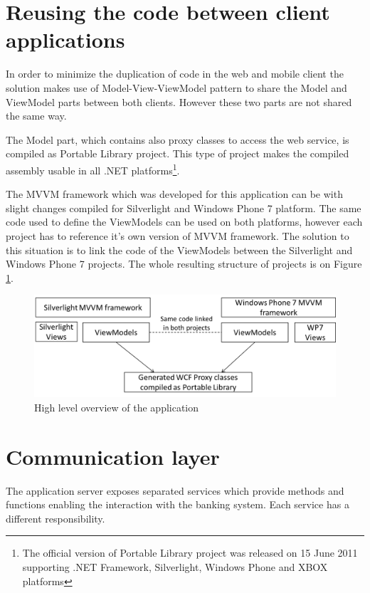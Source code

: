 \section {Reusing the code between client applications}
In order to minimize the duplication of code in the web and mobile client the solution makes use of Model-View-ViewModel pattern to share the Model and ViewModel parts between both clients. However these two parts are not shared the same way.

The Model part, which contains also proxy classes to access the web service, is compiled as Portable Library project. This type of project makes the compiled assembly usable in all .NET platforms\footnote{The official version of Portable Library project was released on 15 June 2011 supporting .NET Framework, Silverlight, Windows Phone and XBOX platforms}.

The MVVM framework which was developed for this application can be with slight changes compiled for Silverlight and Windows Phone 7 platform. The same code used to define the ViewModels can be used on both platforms, however each project has to reference it's own version of MVVM framework. The solution to this situation is to link the code of the ViewModels between the Silverlight and Windows Phone 7 projects. The whole resulting structure of projects is on Figure \ref{fig:reusable_code}.

\begin{figure}[h]
\begin{center}
\includegraphics[width=14cm]{figures/reusable_code}
\caption{High level overview of the application}
\label{fig:reusable_code}
\end{center}
\end{figure}

\section{Communication layer}

The application server exposes separated services which provide methods and functions enabling the interaction with the banking system. Each service has a different responsibility.


